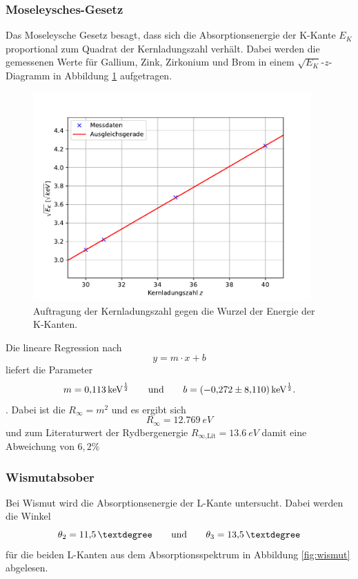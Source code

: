 \subsubsection{Moseleysches-Gesetz}
Das Moseleysche Gesetz besagt, dass sich die Absorptionsenergie der K-Kante $E_K$ proportional zum Quadrat der Kernladungszahl verhält.
Dabei werden die gemessenen Werte für Gallium, Zink, Zirkonium und Brom in einem $\sqrt{E_K}$-$z$-Diagramm in Abbildung \ref{fig:moseley} aufgetragen.

\begin{figure}[h!]
    \centering
    \includegraphics[height=8cm]{Auswertung/Moseley.pdf}
    \caption{Auftragung der Kernladungszahl gegen die Wurzel der Energie der K-Kanten.}
    \label{fig:moseley}
\end{figure}

Die lineare Regression nach 
\begin{equation}
    y = m \cdot x + b
\end{equation}
liefert die Parameter
\begin{equation}
    m = \SI{0.113}{keV^{\frac{1}{2}}}  \qquad \text{und}   \qquad b = \SI{-0,272 \pm 8.110}{keV^{\frac{1}{2}}}. \notag
\end{equation}.
Dabei ist die $R_\infty = m^{2}$ und es ergibt sich
\begin{equation}
    R_\infty = \SI{12,769}{eV}
\end{equation}
und zum Literaturwert der Rydbergenergie $R_\text{$\infty$,Lit} = \SI{13,6}{eV}$ damit eine Abweichung von $6,2 \%$
\subsubsection{Wismutabsober}
Bei Wismut wird die Absorptionsenergie der L-Kante untersucht.
Dabei werden die Winkel
\begin{equation}
    \theta_2 = \SI{11,5}{°} \qquad \text{und} \qquad \theta_3 = \SI{13,5}{°}  \notag
\end{equation}
für die beiden L-Kanten aus dem Absorptionsspektrum in Abbildung \ref{fig:wismut} abgelesen.


